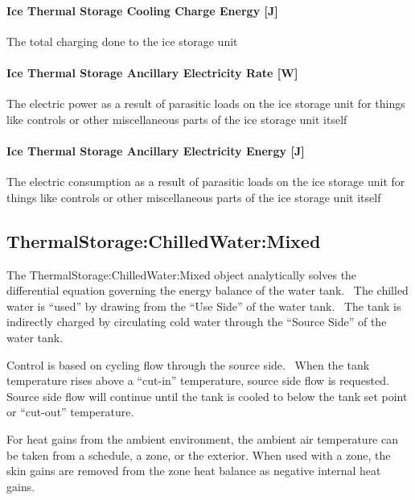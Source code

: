\paragraph{Ice Thermal Storage Cooling Charge Energy {[}J{]}}\label{ice-thermal-storage-cooling-charge-energy-j-1}

The total charging done to the ice storage unit

\paragraph{Ice Thermal Storage Ancillary Electricity Rate {[}W{]}}\label{ice-thermal-storage-ancillary-electric-power-w}

The electric power as a result of parasitic loads on the ice storage unit for things like controls or other miscellaneous parts of the ice storage unit itself

\paragraph{Ice Thermal Storage Ancillary Electricity Energy {[}J{]}}\label{ice-thermal-storage-ancillary-electric-energy-j}

The electric consumption as a result of parasitic loads on the ice storage unit for things like controls or other miscellaneous parts of the ice storage unit itself

\subsection{ThermalStorage:ChilledWater:Mixed}\label{thermalstoragechilledwatermixed}

The ThermalStorage:ChilledWater:Mixed object analytically solves the differential equation governing the energy balance of the water tank.~ The chilled water is ``used'' by drawing from the ``Use Side'' of the water tank.~ The tank is indirectly charged by circulating cold water through the ``Source Side'' of the water tank.

Control is based on cycling flow through the source side.~ When the tank temperature rises above a ``cut-in'' temperature, source side flow is requested.~ Source side flow will continue until the tank is cooled to below the tank set point or ``cut-out'' temperature.

For heat gains from the ambient environment, the ambient air temperature can be taken from a schedule, a zone, or the exterior. When used with a zone, the skin gains are removed from the zone heat balance as negative internal heat gains.

